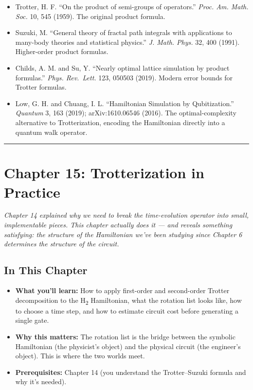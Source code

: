 \documentclass[
  11pt,
  oneside]{book}
\providecommand{\tightlist}{%
  \setlength{\itemsep}{0pt}\setlength{\parskip}{0pt}}
\begin{document}
\begin{itemize}
\tightlist
\item
  Trotter, H. F. ``On the product of semi-groups of operators.''
  \emph{Proc. Am. Math. Soc.} 10, 545 (1959). The original product
  formula.
\item
  Suzuki, M. ``General theory of fractal path integrals with
  applications to many-body theories and statistical physics.'' \emph{J.
  Math. Phys.} 32, 400 (1991). Higher-order product formulas.
\item
  Childs, A. M. and Su, Y. ``Nearly optimal lattice simulation by
  product formulas.'' \emph{Phys. Rev.~Lett.} 123, 050503 (2019). Modern
  error bounds for Trotter formulas.
\item
  Low, G. H. and Chuang, I. L. ``Hamiltonian Simulation by
  Qubitization.'' \emph{Quantum} 3, 163 (2019); arXiv:1610.06546 (2016).
  The optimal-complexity alternative to Trotterization, encoding the
  Hamiltonian directly into a quantum walk operator.
\end{itemize}

\begin{center}\rule{0.5\linewidth}{0.5pt}\end{center}

\chapter{Chapter 15: Trotterization in
Practice}\label{chapter-15-trotterization-in-practice}

\emph{Chapter 14 explained why we need to break the time-evolution
operator into small, implementable pieces. This chapter actually does it
--- and reveals something satisfying: the structure of the Hamiltonian
we've been studying since Chapter 6 determines the structure of the
circuit.}

\section{In This Chapter}\label{in-this-chapter-14}

\begin{itemize}
\tightlist
\item
  \textbf{What you'll learn:} How to apply first-order and second-order
  Trotter decomposition to the H\textsubscript{2} Hamiltonian, what the rotation list
  looks like, how to choose a time step, and how to estimate circuit
  cost before generating a single gate.
\item
  \textbf{Why this matters:} The rotation list is the bridge between the
  symbolic Hamiltonian (the physicist's object) and the physical circuit
  (the engineer's object). This is where the two worlds meet.
\item
  \textbf{Prerequisites:} Chapter 14 (you understand the Trotter--Suzuki
  formula and why it's needed).
\end{itemize}
\end{document}
